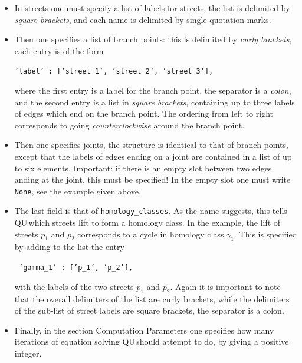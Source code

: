\documentclass[11pt]{article}
\def\QU{{\sf QU}$\,$}
\begin{document}
\begin{itemize}

\item In {\sf streets} one must specify a list of labels for streets, the list is delimited by \emph{square brackets}, and each name is delimited by single quotation marks. 

\smallskip

\item Then one specifies a list of {\sf branch points}: this is delimited by \emph{curly brackets}, each entry is of the form

 \hspace*{10pt} {\texttt{'label' : ['street\_1', 'street\_2', 'street\_3'],}}
 
 where the first entry is a label for the branch point, the separator is a \emph{colon}, and the second entry is a list in \emph{square brackets}, containing up to three labels of edges which end on the branch point. The ordering from left to right corresponds to going \emph{counterclockwise} around the branch point.
 
 \smallskip
 
\item  Then one specifies {\sf joints}, the structure is identical to that of branch points, except that the labels of edges ending on a joint are contained in a list of up to six elements. {Important:} if there is an empty slot between two edges anding at the joint, this must be specified! In the empty slot one must write {\texttt{None}}, see the example given above.

\smallskip

\item The last field is that of {\texttt{homology\_classes}}. As the name suggests, this tells \QU which streets lift to form a homology class. 
In the example, the lift of streets $p_1$ and $p_2$ corresponds to a cycle in homology class $\gamma_1$. This is specified by adding to the list the entry

\noindent\texttt{ \hspace*{10pt} 'gamma\_1' : ['p\_1', 'p\_2'],}

with the labels of the two streets $p_1$ and $p_2$. Again it is important to note that the overall delimiters of the list are curly brackets, while the delimiters of the sub-list of street labels are square brackets, the separator is a colon.

\smallskip

\item Finally, in the section {\sf Computation Parameters} one specifies how many iterations of equation solving \QU should attempt to do, by giving a positive integer.
\end{itemize}
\end{document}
